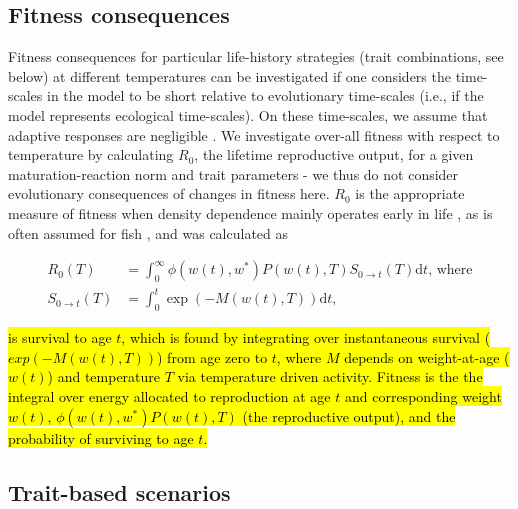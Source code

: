 \documentclass[11pt]{article}\usepackage[]{graphicx}\usepackage[]{color,soul}
\begin{document}
\subsection*{Fitness consequences}

Fitness consequences for particular life-history strategies (trait combinations, see below) at different temperatures can be investigated if one considers the time-scales in the model to be short relative to evolutionary time-scales (i.e., if the model represents ecological time-scales). On these time-scales, we assume that adaptive responses are negligible \cite[see, however, ][]{moffett_local_2018, sandblom_plastic_2016}. We investigate over-all fitness with respect to temperature by calculating $R_0$, the lifetime reproductive output, for a given maturation-reaction norm and trait parameters - we thus do not consider evolutionary consequences of changes in fitness here. $R_0$ is the appropriate measure of fitness when density dependence mainly operates early in life \cite{kozlowskican2004}, as is often assumed for fish \cite{andersenwhen2017, lorenzendensity2018}, and was calculated as 

\begin{align}
R_0(T) &= \int_0^\infty \phi(w(t),w^*)P(w(t),T)S_{0 \rightarrow t}(T) \text{d}t \text{, where} \\
S_{0 \rightarrow t}(T) &= \int_0^t \exp(-M(w(t),T))\text{d}t, 
\end{align}

\hl{is survival to age $t$, which is found by integrating over instantaneous survival ($exp(-M(w(t),T))$) from age zero to $t$, where $M$ depends on weight-at-age ($w(t)$) and temperature $T$ via temperature driven activity. Fitness is the the integral over energy allocated to reproduction at age $t$ and corresponding weight $w(t)$, $\phi(w(t),w^*)P(w(t),T)$ (the reproductive output), and the probability of surviving to age $t$.}

\subsection*{Trait-based scenarios}
\end{document}
